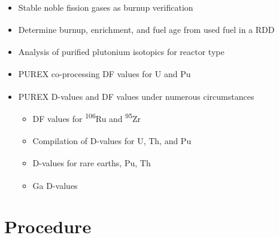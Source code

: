 \documentclass{beamer}
\newcommand{\tss}{\textsuperscript}
\begin{document}
\begin{frame}
  \begin{itemize}
  \item{Stable noble fission gases as burnup verification\tss{\cite{RN114}}}
  \item{Determine burnup, enrichment, and fuel age from used fuel in a RDD\tss{\cite{RN118}}}
  \item{Analysis of purified plutonium isotopics for reactor type\tss{\cite{RN109}}}
  \item{PUREX co-processing DF values for U and Pu\tss{\cite{RN123}}}
  \item{PUREX D-values and DF values under numerous
    circumstances\tss{\cite{benedict1982nuclear,RN169,RN167,RN168,RN177,stoller1961reactor}}}
    \begin{itemize}
    \item{DF values for \tss{106}Ru and \tss{95}Zr\tss{\cite{stoller1961reactor}}}
    \item{Compilation of D-values for U, Th, and Pu\tss{\cite{RN208}}}
    \item{D-values for rare earths, Pu,
      Th\tss{\cite{RN168,RN181,RN182,RN186,RN179,RN180,RN187,RN185,RN183,RN189}}}
    \item{Ga D-values\tss{\cite{RN189}}}
    \end{itemize}
  \end{itemize}
\end{frame}



\section{Procedure}
\begin{frame}
  \sectionpage
\end{frame}
\end{document}
